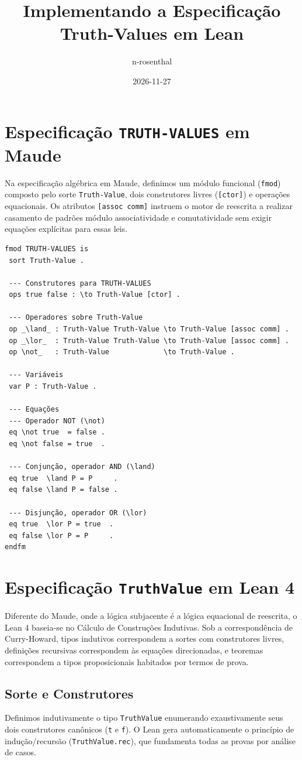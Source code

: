 \documentclass[11pt,a4paper]{scrartcl}
\author{n-rosenthal}
\date{2026-11-27}
\title{Implementando a Especificação Truth-Values em Lean}
\begin{document}
\maketitle
\tableofcontents

\section{Especificação \texttt{TRUTH-VALUES} em Maude}
\label{sec:orgb624d83}
Na especificação algébrica em Maude, definimos um módulo funcional (\texttt{fmod}) composto pelo sorte \texttt{Truth-Value}, dois construtores livres (\texttt{[ctor]}) e operações equacionais. Os atributos \texttt{[assoc comm]} instruem o motor de reescrita a realizar casamento de padrões módulo associatividade e comutatividade sem exigir equações explícitas para essas leis.

\begin{lstlisting}[language=maude,numbers=none]
fmod TRUTH-VALUES is
 sort Truth-Value .

 --- Construtores para TRUTH-VALUES
 ops true false : \to Truth-Value [ctor] .

 --- Operadores sobre Truth-Value
 op _\land_ : Truth-Value Truth-Value \to Truth-Value [assoc comm] .
 op _\lor_  : Truth-Value Truth-Value \to Truth-Value [assoc comm] .
 op \not_   : Truth-Value             \to Truth-Value .

 --- Variáveis
 var P : Truth-Value .

 --- Equações
 --- Operador NOT (\not)
 eq \not true  = false .
 eq \not false = true  .

 --- Conjunção, operador AND (\land)
 eq true  \land P = P     .
 eq false \land P = false .

 --- Disjunção, operador OR (\lor)
 eq true  \lor P = true  .
 eq false \lor P = P     .
endfm
\end{lstlisting}
\section{Especificação \texttt{TruthValue} em Lean 4}
\label{sec:org6399b4c}
Diferente do Maude, onde a lógica subjacente é a lógica equacional de reescrita, o Lean 4 baseia-se no Cálculo de Construções Indutivas. Sob a correspondência de Curry-Howard, tipos indutivos correspondem a sortes com construtores livres, definições recursivas correspondem às equações direcionadas, e teoremas correspondem a tipos proposicionais habitados por termos de prova.
\subsection{Sorte e Construtores}
\label{sec:org8caeb96}
Definimos indutivamente o tipo \texttt{TruthValue} enumerando exaustivamente seus dois construtores canônicos (\texttt{t} e \texttt{f}). O Lean gera automaticamente o princípio de indução/recursão (\texttt{TruthValue.rec}), que fundamenta todas as provas por análise de casos.
\end{document}
